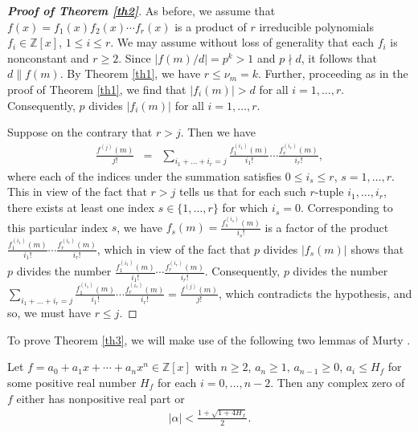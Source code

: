 \documentclass[12pt,reqno]{amsart}%
\begin{document}
\begin{proof}[\bf Proof of Theorem \ref{th2}]  As before, we assume that $f(x)=f_1(x)f_2(x)\cdots f_r(x)$ is a product of $r$ irreducible polynomials $f_i\in\mathbb Z[x]$, $1\leq i\leq r$. We may assume without loss of generality that each $f_i$ is nonconstant and $r\geq 2$. Since $|f(m)/d|=p^k>1$ and $p\nmid d$, it follows that $d\|f(m)$. By Theorem \ref{th1}, we have $r\leq \nu_m=k$. Further, proceeding as in the proof of Theorem  \ref{th1}, we find that $|f_i(m)|>d$ for all $i=1,\ldots,r$. Consequently, $p$ divides $|f_i(m)|$ for all $i=1,\ldots,r$.

Suppose on the contrary that $r>j$. Then we have
\begin{eqnarray*}
\frac{f^{(j)}(m)}{j!} &=& \sum_{i_1+\ldots+i_r=j} \frac{f_1^{(i_1)}(m)}{i_1!}\cdots \frac{f_r^{(i_r)}(m)}{i_r!},
\end{eqnarray*}
where each of the indices under the summation satisfies $0\leq i_s\leq r$, $s=1,\ldots,r$. This in view of the fact that $r>j$ tells us that for each such $r$-tuple $i_1,\ldots,i_r$, there exists at least one index $s\in \{1,\ldots,r\}$  for which $i_s=0$. Corresponding to this particular index $s$, we have $f_s(m)=\frac{f_s^{(i_s)}(m)}{i_s!}$  is a factor of the product $\frac{f_1^{(i_1)}(m)}{i_1!}\cdots \frac{f_r^{(i_r)}(m)}{i_r!}$, which in view of the fact that $p$ divides $|f_s(m)|$  shows that $p$ divides the number $\frac{f_1^{(i_1)}(m)}{i_1!}\cdots \frac{f_r^{(i_r)}(m)}{i_r!}$. Consequently, $p$ divides the number $\sum_{i_1+\ldots+i_r=j} \frac{f_1^{(i_1)}(m)}{i_1!}\cdots \frac{f_r^{(i_r)}(m)}{i_r!}=\frac{f^{(j)}(m)}{j!}$, which contradicts the hypothesis, and so, we must have $r\leq j$.
\end{proof}
To prove Theorem \ref{th3}, we will make use of the following two lemmas of Murty \cite{Mu}.
\begin{lemmax}[\cite{Mu}]\label{lemma1}
    Let $f=a_0+a_1 x+\cdots+a_n x^n\in \mathbb{Z}[x]$ with $n\geq 2$, $a_n\geq 1$, $a_{n-1}\geq 0$, $a_i\leq H_f$ for some positive real number $H_f$ for each $i=0,\ldots,n-2$. Then any complex zero of $f$ either has nonpositive real part or
    \begin{eqnarray*}
|\alpha|<\frac{1+\sqrt{1+4H_f}}{2}.
    \end{eqnarray*}
\end{lemmax}
\end{document}
